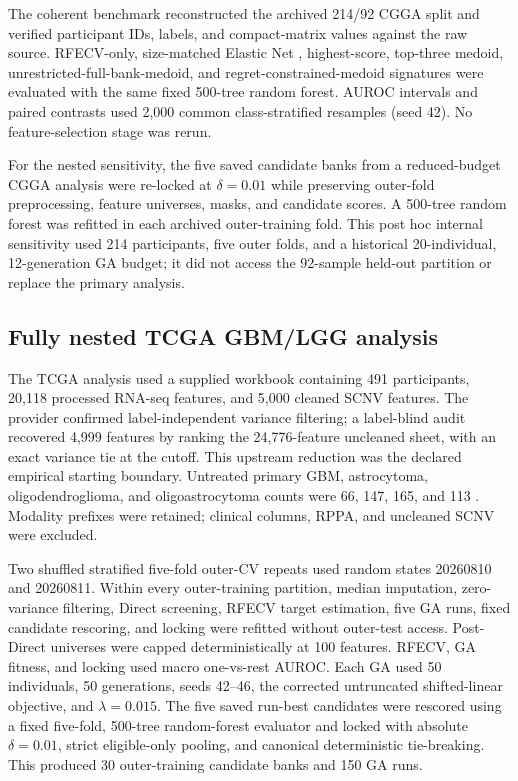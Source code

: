 The coherent benchmark reconstructed the archived 214/92 CGGA split and verified participant IDs, labels, and compact-matrix values against the raw source. RFECV-only, size-matched Elastic Net \citep{ref35}, highest-score, top-three medoid, unrestricted-full-bank-medoid, and regret-constrained-medoid signatures were evaluated with the same fixed 500-tree random forest. AUROC intervals and paired contrasts used 2,000 common class-stratified resamples (seed 42). No feature-selection stage was rerun.

For the nested sensitivity, the five saved candidate banks from a reduced-budget CGGA analysis were re-locked at \(\delta=0.01\) while preserving outer-fold preprocessing, feature universes, masks, and candidate scores. A 500-tree random forest was refitted in each archived outer-training fold. This post hoc internal sensitivity used 214 participants, five outer folds, and a historical 20-individual, 12-generation GA budget; it did not access the 92-sample held-out partition or replace the primary analysis.

\subsection{Fully nested TCGA GBM/LGG analysis}

The TCGA analysis used a supplied workbook containing 491 participants, 20,118 processed RNA-seq features, and 5,000 cleaned SCNV features. The provider confirmed label-independent variance filtering; a label-blind audit recovered 4,999 features by ranking the 24,776-feature uncleaned sheet, with an exact variance tie at the cutoff. This upstream reduction was the declared empirical starting boundary. Untreated primary GBM, astrocytoma, oligodendroglioma, and oligoastrocytoma counts were 66, 147, 165, and 113 \citep{ref44,ref45,ref46}. Modality prefixes were retained; clinical columns, RPPA, and uncleaned SCNV were excluded.

Two shuffled stratified five-fold outer-CV repeats used random states 20260810 and 20260811. Within every outer-training partition, median imputation, zero-variance filtering, Direct screening, RFECV target estimation, five GA runs, fixed candidate rescoring, and locking were refitted without outer-test access. Post-Direct universes were capped deterministically at 100 features. RFECV, GA fitness, and locking used macro one-vs-rest AUROC. Each GA used 50 individuals, 50 generations, seeds 42--46, the corrected untruncated shifted-linear objective, and \(\lambda=0.015\). The five saved run-best candidates were rescored using a fixed five-fold, 500-tree random-forest evaluator and locked with absolute \(\delta=0.01\), strict eligible-only pooling, and canonical deterministic tie-breaking. This produced 30 outer-training candidate banks and 150 GA runs.

